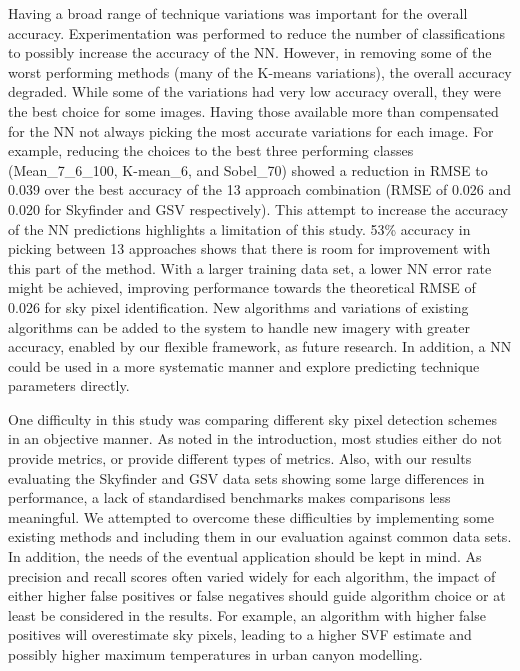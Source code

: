 \documentclass[final,3p,times,authoryear]{elsarticle}
\begin{document}
Having a broad range of technique variations was important for the overall accuracy. Experimentation was performed to reduce the number of classifications to possibly increase the accuracy of the NN. However, in removing some of the worst performing methods (many of the K-means variations), the overall accuracy degraded. While some of the variations had very low accuracy overall, they were the best choice for some images. Having those available more than compensated for the NN not always picking the most accurate variations for each image. For example, reducing the choices to the best three performing classes (Mean\_7\_6\_100, K-mean\_6, and Sobel\_70) showed a reduction in RMSE to 0.039 over the best accuracy of the 13 approach combination (RMSE of 0.026 and 0.020 for Skyfinder and GSV respectively). This attempt to increase the accuracy of the NN predictions highlights a limitation of this study. 53\% accuracy in picking between 13 approaches shows that there is room for improvement with this part of the method. With a larger training data set, a lower NN error rate might be achieved, improving performance towards the theoretical RMSE of 0.026 for sky pixel identification. New algorithms and variations of existing algorithms can be added to the system to handle new imagery with greater accuracy, enabled by our flexible framework, as future research. In addition, a NN could be used in a more systematic manner and explore predicting technique parameters directly. 

One difficulty in this study was comparing different sky pixel detection schemes in an objective manner. As noted in the introduction, most studies either do not provide metrics, or provide different types of metrics. Also, with our results evaluating the Skyfinder and GSV data sets showing some large differences in performance, a lack of standardised benchmarks makes comparisons less meaningful. We attempted to overcome these difficulties by implementing some existing methods and including them in our evaluation against common data sets. In addition, the needs of the eventual application should be kept in mind. As precision and recall scores often varied widely for each algorithm, the impact of either higher false positives or false negatives should guide algorithm choice or at least be considered in the results. For example, an algorithm with higher false positives will overestimate sky pixels, leading to a higher SVF estimate and possibly higher maximum temperatures in urban canyon modelling. 
\end{document}
